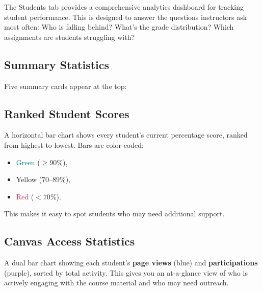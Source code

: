 \documentclass[12pt,letterpaper]{article}
\begin{document}
The Students tab provides a comprehensive analytics dashboard for tracking student performance. This is designed to answer the questions instructors ask most often: Who is falling behind? What's the grade distribution? Which assignments are students struggling with?

\subsection{Summary Statistics}

Five summary cards appear at the top:

\begin{center}
\end{center}

\subsection{Ranked Student Scores}

A horizontal bar chart shows every student's current percentage score, ranked from highest to lowest. Bars are color-coded:
\begin{itemize}
    \item \textcolor{teal}{Green} ($\geq 90\%$),
    \item \textcolor{amber}{Yellow} ($70$--$89\%$),
    \item \textcolor{crimson}{Red} ($< 70\%$).
\end{itemize}

This makes it easy to spot students who may need additional support.

\subsection{Canvas Access Statistics}

A dual bar chart showing each student's \textbf{page views} (blue) and \textbf{participations} (purple), sorted by total activity. This gives you an at-a-glance view of who is actively engaging with the course material and who may need outreach.
\end{document}
